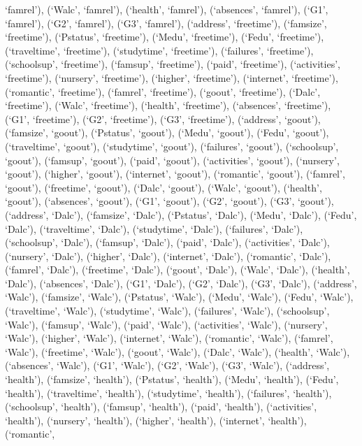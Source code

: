 \documentclass[
]{article}
\begin{document}
`famrel'), (`Walc', `famrel'), (`health', `famrel'), (`absences',
`famrel'), (`G1', `famrel'), (`G2', `famrel'), (`G3', `famrel'),
(`address', `freetime'), (`famsize', `freetime'), (`Pstatus',
`freetime'), (`Medu', `freetime'), (`Fedu', `freetime'), (`traveltime',
`freetime'), (`studytime', `freetime'), (`failures', `freetime'),
(`schoolsup', `freetime'), (`famsup', `freetime'), (`paid', `freetime'),
(`activities', `freetime'), (`nursery', `freetime'), (`higher',
`freetime'), (`internet', `freetime'), (`romantic', `freetime'),
(`famrel', `freetime'), (`goout', `freetime'), (`Dalc', `freetime'),
(`Walc', `freetime'), (`health', `freetime'), (`absences', `freetime'),
(`G1', `freetime'), (`G2', `freetime'), (`G3', `freetime'), (`address',
`goout'), (`famsize', `goout'), (`Pstatus', `goout'), (`Medu', `goout'),
(`Fedu', `goout'), (`traveltime', `goout'), (`studytime', `goout'),
(`failures', `goout'), (`schoolsup', `goout'), (`famsup', `goout'),
(`paid', `goout'), (`activities', `goout'), (`nursery', `goout'),
(`higher', `goout'), (`internet', `goout'), (`romantic', `goout'),
(`famrel', `goout'), (`freetime', `goout'), (`Dalc', `goout'), (`Walc',
`goout'), (`health', `goout'), (`absences', `goout'), (`G1', `goout'),
(`G2', `goout'), (`G3', `goout'), (`address', `Dalc'), (`famsize',
`Dalc'), (`Pstatus', `Dalc'), (`Medu', `Dalc'), (`Fedu', `Dalc'),
(`traveltime', `Dalc'), (`studytime', `Dalc'), (`failures', `Dalc'),
(`schoolsup', `Dalc'), (`famsup', `Dalc'), (`paid', `Dalc'),
(`activities', `Dalc'), (`nursery', `Dalc'), (`higher', `Dalc'),
(`internet', `Dalc'), (`romantic', `Dalc'), (`famrel', `Dalc'),
(`freetime', `Dalc'), (`goout', `Dalc'), (`Walc', `Dalc'), (`health',
`Dalc'), (`absences', `Dalc'), (`G1', `Dalc'), (`G2', `Dalc'), (`G3',
`Dalc'), (`address', `Walc'), (`famsize', `Walc'), (`Pstatus', `Walc'),
(`Medu', `Walc'), (`Fedu', `Walc'), (`traveltime', `Walc'),
(`studytime', `Walc'), (`failures', `Walc'), (`schoolsup', `Walc'),
(`famsup', `Walc'), (`paid', `Walc'), (`activities', `Walc'),
(`nursery', `Walc'), (`higher', `Walc'), (`internet', `Walc'),
(`romantic', `Walc'), (`famrel', `Walc'), (`freetime', `Walc'),
(`goout', `Walc'), (`Dalc', `Walc'), (`health', `Walc'), (`absences',
`Walc'), (`G1', `Walc'), (`G2', `Walc'), (`G3', `Walc'), (`address',
`health'), (`famsize', `health'), (`Pstatus', `health'), (`Medu',
`health'), (`Fedu', `health'), (`traveltime', `health'), (`studytime',
`health'), (`failures', `health'), (`schoolsup', `health'), (`famsup',
`health'), (`paid', `health'), (`activities', `health'), (`nursery',
`health'), (`higher', `health'), (`internet', `health'), (`romantic',
\end{document}
